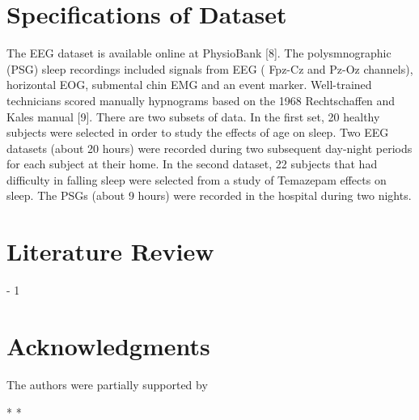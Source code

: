 \documentclass[12pt,letterpaper]{article}
\begin{document}
\section*{Specifications of Dataset}

The EEG dataset is available online at PhysioBank [8]. The polysmnographic (PSG) sleep recordings included signals from EEG ( Fpz-Cz and Pz-Oz channels), horizontal EOG, submental chin EMG and an event marker. Well-trained technicians scored manually hypnograms based on the 1968 Rechtschaffen and Kales manual [9].
There are two subsets of data. In the first set, 20 healthy subjects were selected in order to study the effects of age on sleep. Two EEG datasets (about 20 hours) were recorded during two subsequent day-night periods for each subject at their home. In the second dataset, 22 subjects that had difficulty in falling sleep were selected from a study of Temazepam effects on sleep. The PSGs (about 9 hours) were recorded in the hospital during two nights.




\section*{Literature Review}\label{sec:lit_review}
\looseness - 1
\section*{Acknowledgments}
The authors were partially supported by 





*
*


\end{document}
